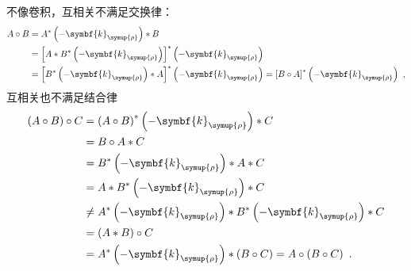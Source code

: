 不像卷积，互相关不满足交换律：
\begin{subequations} \label{eq:2-199}
	\abovedisplayskip=10pt
	\belowdisplayskip=10pt
	\begin{align}
		A \circ B &= A^* \left( - \symbf{k}_{\symup{\rho}} \right) * B \label{eq:2-199a} \\ &= \left[ A * B^* \left( - \symbf{k}_{\symup{\rho}} \right) \right]^* \left( - \symbf{k}_{\symup{\rho}} \right) \label{eq:2-199b} \\ &= \left[ B^* \left( - \symbf{k}_{\symup{\rho}} \right) * A \right]^* \left( - \symbf{k}_{\symup{\rho}} \right) = \left[ B \circ A \right]^* \left( - \symbf{k}_{\symup{\rho}} \right) \label{eq:2-199c}~, 
	\end{align}
\end{subequations}
互相关也不满足结合律
\begin{subequations} \label{eq:2-200}
	\abovedisplayskip=10pt
	\belowdisplayskip=10pt
	\begin{align}
		\left( A \circ B \right) \circ C &= \left( A \circ B \right)^* \left( - \symbf{k}_{\symup{\rho}} \right) * C \label{eq:2-200a} \\ &= B \circ A * C \label{eq:2-200b} \\ &= B^* \left( - \symbf{k}_{\symup{\rho}} \right) * A * C \label{eq:2-200c} \\ &= A * B^* \left( - \symbf{k}_{\symup{\rho}} \right) * C \label{eq:2-200d} \\ &\neq A^* \left( - \symbf{k}_{\symup{\rho}} \right) * B^* \left( - \symbf{k}_{\symup{\rho}} \right) * C \label{eq:2-200e} \\ &= \left( A * B \right) \circ C \label{eq:2-200f} \\ &= A^* \left( - \symbf{k}_{\symup{\rho}} \right) * \left( B \circ C \right) = A \circ \left( B \circ C \right) \label{eq:2-200g}~. 
	\end{align}
\end{subequations}

